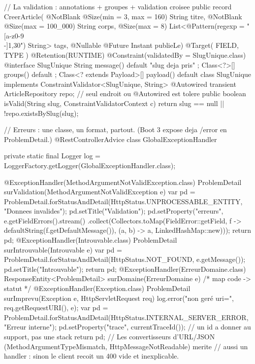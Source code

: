 \documentclass[12pt,a4paper,twoside,openright]{book}
\begin{document}
\begin{codejava}
// La validation : annotations + groupes + validation croisee
public record CreerArticle(
        @NotBlank @Size(min = 3, max = 160) String titre,
        @NotBlank @Size(max = 100_000) String corps,
        @Size(max = 8) List<@Pattern(regexp = "[a-z0-9\\-]{1,30}") String> tags,
        @Nullable @Future Instant publieLe) { }
@Target({ FIELD, TYPE }) @Retention(RUNTIME) @Constraint(validatedBy = SlugUnique.class)
@interface SlugUnique { String message() default "slug deja pris" ; Class<?>[] groups() default { } ; Class<? extends Payload>[] payload() default { } }
class SlugUnique implements ConstraintValidator<SlugUnique, String> {
    @Autowired transient ArticleRepository repo;              // seul endroit ou @Autowired est tolere
    public boolean isValid(String slug, ConstraintValidatorContext c) { return slug == null || !repo.existsBySlug(slug); }
}

// Erreurs : une classe, un format, partout. (Boot 3 expose deja /error en ProblemDetail.)
@RestControllerAdvice
class GlobalExceptionHandler {
    private static final Logger log = LoggerFactory.getLogger(GlobalExceptionHandler.class);

    @ExceptionHandler(MethodArgumentNotValidException.class)
    ProblemDetail surValidation(MethodArgumentNotValidException e) {
        var pd = ProblemDetail.forStatusAndDetail(HttpStatus.UNPROCESSABLE_ENTITY, "Donnees invalides");
        pd.setTitle("Validation"); pd.setProperty("erreurs", e.getFieldErrors().stream()
                .collect(Collectors.toMap(FieldError::getField, f -> defaultString(f.getDefaultMessage()), (a, b) -> a, LinkedHashMap::new)));
        return pd;
    }
    @ExceptionHandler(Introuvable.class)
    ProblemDetail surIntrouvable(Introuvable e) {
        var pd = ProblemDetail.forStatusAndDetail(HttpStatus.NOT_FOUND, e.getMessage()); pd.setTitle("Introuvable"); return pd;
    }
    @ExceptionHandler(ErreurDomaine.class)
    ResponseEntity<ProblemDetail> surDomaine(ErreurDomaine e) { /* map code -> statut */ }
    @ExceptionHandler(Exception.class)
    ProblemDetail surImprevu(Exception e, HttpServletRequest req) {
        log.error("non ger\'e uri={}", req.getRequestURI(), e);
        var pd = ProblemDetail.forStatusAndDetail(HttpStatus.INTERNAL_SERVER_ERROR, "Erreur interne");
        pd.setProperty("trace", currentTraceId());            // un id a donner au support, pas une stack
        return pd;
    }
    // Les convertisseurs d'URL/JSON (MethodArgumentTypeMismatch, HttpMessageNotReadable) merite
    // aussi un handler : sinon le client recoit un 400 vide et inexplicable.
}
\end{codejava}
\end{document}
